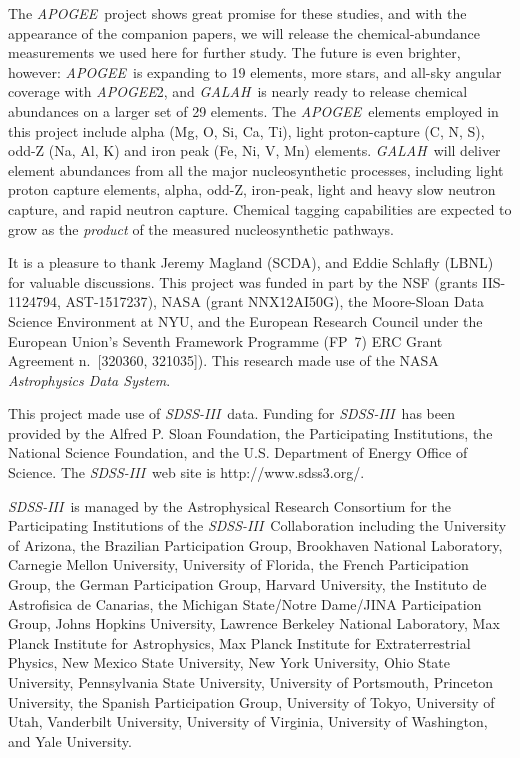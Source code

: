 \documentclass[12pt, letterpaper, preprint]{aastex}
\newcommand{\acronym}[1]{{\small{#1}}}
\newcommand{\project}[1]{\textsl{#1}}
\newcommand{\sdssiii}{\project{\acronym{SDSS-III}}}
\newcommand{\apogee}{\project{\acronym{APOGEE}}}
\newcommand{\galah}{\project{\acronym{GALAH}}}
\begin{document}
The \apogee\ project shows great promise for these studies, and with
the appearance of the companion papers, we will release the
chemical-abundance measurements we used here for further study.
The future is even brighter, however: \apogee\ is expanding to 19
elements, more stars, and all-sky angular coverage with \apogee2, and
\galah\ is nearly ready to release chemical abundances on a larger set
of 29 elements.
The \apogee\ elements employed in this project include alpha
(Mg, O, Si, Ca, Ti), light proton-capture (C, N, S), odd-Z (Na, Al, K)
and iron peak (Fe, Ni, V, Mn) elements.
\galah\ will deliver element abundances from all the major
nucleosynthetic processes, including light proton capture elements,
alpha, odd-Z, iron-peak, light and heavy slow neutron capture, and
rapid neutron capture.
Chemical tagging capabilities are expected to grow as the
\emph{product} of the measured nucleosynthetic pathways.

\acknowledgements
It is a pleasure to thank
  Jeremy Magland (\acronym{SCDA}), and
  Eddie Schlafly (\acronym{LBNL})
for valuable discussions.
This project was funded in part by
  the \acronym{NSF} (grants \acronym{IIS-1124794}, \acronym{AST-1517237}),
  \acronym{NASA} (grant \acronym{NNX12AI50G}),
  the Moore-Sloan Data Science Environment at \acronym{NYU}, and
  the European Research Council under the
  European Union's Seventh Framework Programme (FP~7)
  \acronym{ERC} Grant Agreement n.~\acronym{[320360, 321035]}).
This research made use of the \acronym{NASA} \project{Astrophysics Data System}.

This project made use of \sdssiii\ data.
Funding for \sdssiii\ has been provided by the Alfred P. Sloan
Foundation, the Participating Institutions, the National Science
Foundation, and the \acronym{U.S.} Department of Energy Office of Science. The
\sdssiii\ web site is http://www.sdss3.org/.

\sdssiii\ is managed by the Astrophysical Research Consortium for the
Participating Institutions of the \sdssiii\ Collaboration including the
University of Arizona, the Brazilian Participation Group, Brookhaven
National Laboratory, Carnegie Mellon University, University of
Florida, the French Participation Group, the German Participation
Group, Harvard University, the Instituto de Astrofisica de Canarias,
the Michigan State/Notre Dame/\acronym{JINA} Participation Group, Johns Hopkins
University, Lawrence Berkeley National Laboratory, Max Planck
Institute for Astrophysics, Max Planck Institute for Extraterrestrial
Physics, New Mexico State University, New York University, Ohio State
University, Pennsylvania State University, University of Portsmouth,
Princeton University, the Spanish Participation Group, University of
Tokyo, University of Utah, Vanderbilt University, University of
Virginia, University of Washington, and Yale University.
\end{document}
